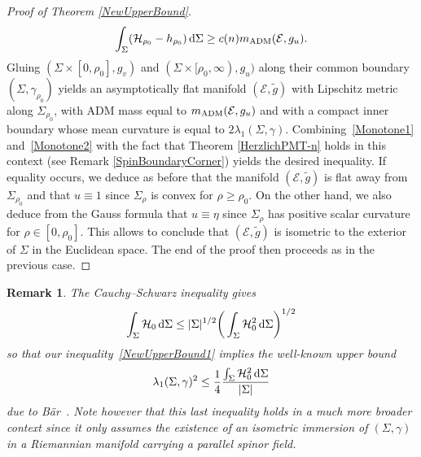 \documentclass[pdftex]{sigma}
\numberwithin{equation}{section}
\newtheorem{Remark}[Theorem]{Remark}
\begin{document}
\begin{proof}[Proof of Theorem \ref{NewUpperBound}]
\begin{gather}\label{Monotone2}
\int_{\Sigma}(\mathcal{H}_{\rho_0}-h_{\rho_0})\,{\rm d}\Sigma\geq c(n)m_{\rm ADM}(\mathcal{E},g_u).
\end{gather}
Gluing $(\Sigma\times[0,\rho_0],g_v)$ and $(\Sigma\times[\rho_0,\infty),g_u)$ along their common boundary $(\Sigma,\gamma_{\rho_0})$ yields an asymptotically flat manifold $(\mathcal{E},\widetilde{g})$ with Lipschitz metric along $\Sigma_{\rho_0}$, with ADM mass equal to $m_{\rm ADM}(\mathcal{E},g_u)$ and with a compact inner boundary whose mean curvature is equal to $2\lambda_1(\Sigma,\gamma)$. Combining~\eqref{Monotone1} and~\eqref{Monotone2} with the fact that Theorem \ref{HerzlichPMT-n} holds in this context (see Remark \ref{SpinBoundaryCorner}) yields the desired inequality. If equality occurs, we deduce as before that the manifold $(\mathcal{E},\widetilde{g})$ is flat away from $\Sigma_{\rho_0}$ and that $u\equiv 1$ since $\Sigma_\rho$ is convex for $\rho\geq \rho_0$. On the other hand, we also deduce from the Gauss formula that $u\equiv \eta$ since $\Sigma_\rho$ has positive scalar curvature for $\rho\in[0,\rho_0]$. This allows to conclude that $(\mathcal{E},\widetilde{g})$ is isometric to the exterior of $\Sigma$ in the Euclidean space. The end of the proof then proceeds as in the previous case.
\end{proof}

\begin{Remark}
The Cauchy--Schwarz inequality gives
\begin{gather*}
\int_\Sigma \mathcal{H}_0\,{\rm d}\Sigma\leq |\Sigma|^{1/2}\bigg(\int_\Sigma \mathcal{H}_0^2\,{\rm d}\Sigma\bigg)^{1/2}
\end{gather*}
so that our inequality~\eqref{NewUpperBound1} implies the well-known upper bound
\begin{gather*}%
\lambda_1(\Sigma,\gamma)^2\leq\frac{1}{4}
\frac{\int_\Sigma \mathcal{H}_0^2\,{\rm d}\Sigma}{|\Sigma|}
\end{gather*}
due to B\"ar~\cite{Bar1}. Note however that this last inequality holds in a much more broader context since it only assumes the existence of an isometric immersion of $(\Sigma,\gamma)$ in a Riemannian manifold carrying a parallel spinor field.
\end{Remark}
\end{document}
